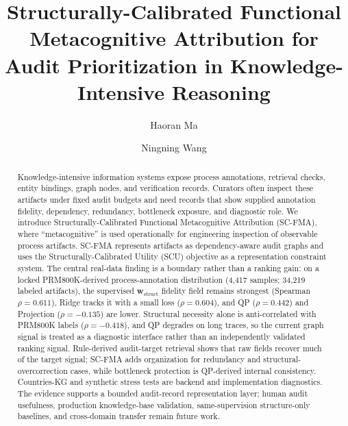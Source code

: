 \documentclass[a4paper,fleqn]{cas-sc}
\newcommand{\wstruct}{\ensuremath{\mathbf{w}_{\mathrm{struct}}}}
\begin{document}
\let\WriteBookmarks\relax
\def\floatpagepagefraction{1}
\def\textpagefraction{.001}


\title[mode=title]{Structurally-Calibrated Functional Metacognitive Attribution for Audit Prioritization in Knowledge-Intensive Reasoning}

\author[1]{Haoran Ma}

\author[1,2]{Ningning Wang}

\renewcommand{\printorcid}{}



\begin{abstract}
Knowledge-intensive information systems expose process annotations, retrieval checks, entity bindings, graph nodes, and verification records. Curators often inspect these artifacts under fixed audit budgets and need records that show supplied annotation fidelity, dependency, redundancy, bottleneck exposure, and diagnostic role. We introduce Structurally-Calibrated Functional Metacognitive Attribution (SC-FMA), where ``metacognitive'' is used operationally for engineering inspection of observable process artifacts. SC-FMA represents artifacts as dependency-aware audit graphs and uses the Structurally-Calibrated Utility (SCU) objective as a representation constraint system. The central real-data finding is a boundary rather than a ranking gain: on a locked PRM800K-derived process-annotation distribution (4,417 samples; 34,219 labeled artifacts), the supervised \wstruct{} fidelity field remains strongest (Spearman $\rho=0.611$), Ridge tracks it with a small loss ($\rho=0.604$), and QP ($\rho=0.442$) and Projection ($\rho=-0.135$) are lower. Structural necessity alone is anti-correlated with PRM800K labels ($\rho=-0.418$), and QP degrades on long traces, so the current graph signal is treated as a diagnostic interface rather than an independently validated ranking signal. Rule-derived audit-target retrieval shows that raw fields recover much of the target signal; SC-FMA adds organization for redundancy and structural-overcorrection cases, while bottleneck protection is QP-derived internal consistency. Countries-KG and synthetic stress tests are backend and implementation diagnostics. The evidence supports a bounded audit-record representation layer; human audit usefulness, production knowledge-base validation, same-supervision structure-only baselines, and cross-domain transfer remain future work.
\end{abstract}
\end{document}
